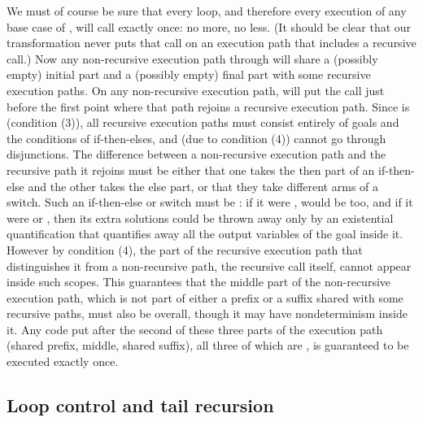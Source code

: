 We must of course be sure that every loop,
and therefore every execution of any base case of ,
will call \lcfinish exactly once: no more, no less.
(It should be clear that our transformation never puts that call
on an execution path that includes a recursive call.)
Now any non-recursive execution path through 
will share a (possibly empty) initial part
and a (possibly empty) final part with some recursive execution paths.
On any non-recursive execution path,
\putbarriers will put the call \lcfinish
just before the first point where that path
rejoins a recursive execution path.
Since  is \ddet (condition (3)),
all recursive execution paths must consist
entirely of \ddet goals and the conditions of if-then-elses,
and (due to condition (4)) cannot go through disjunctions.
The difference between a non-recursive execution path
and the recursive path it rejoins
must be either that
one takes the then part of an if-then-else and the other takes the else part,
or that they take different arms of a switch.
Such an if-then-else or switch must be \ddet:
if it were \dsemidet,  would be too,
and if it were \dnondet or \dmulti,
then its extra solutions could be thrown away
only by an existential quantification that quantifies away
all the output variables of the goal inside it.
However by condition (4),
the part of the recursive execution path
that distinguishes it from a non-recursive path,
the recursive call itself,
cannot appear inside such scopes.
This guarantees that the middle part of the non-recursive execution path,
which is not part of either
a prefix or a suffix shared with some recursive paths,
must also be \ddet overall,
though it may have nondeterminism inside it.
Any code put after the second of these three parts of the execution path
(shared prefix, middle, shared suffix),
all three of which are \ddet,
is guaranteed to be executed exactly once.


\subsection{Loop control and tail recursion}
\label{sec:lc_tailrec}

